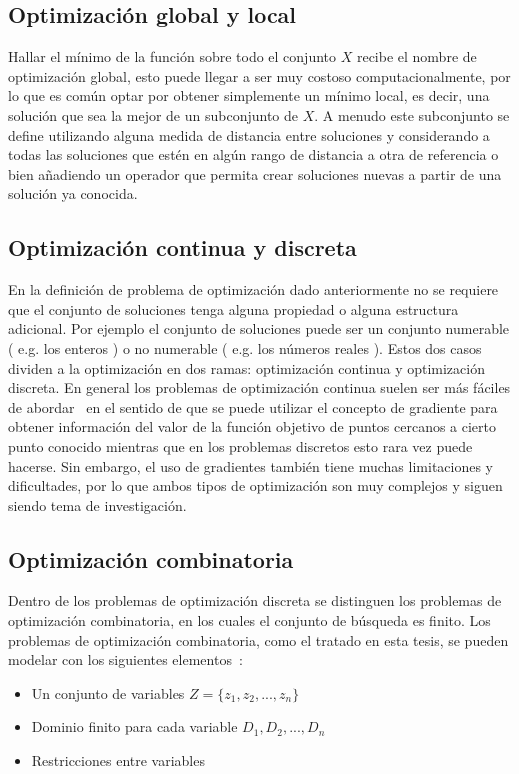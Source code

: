 \subsection*{Optimización global y local}

Hallar el mínimo de la función sobre todo el conjunto $X$ recibe el nombre de optimización global, esto puede llegar a ser muy costoso computacionalmente,
por lo que es común optar por obtener simplemente un mínimo local, es decir, una solución que sea la mejor de un subconjunto de $X$. 
%
A menudo este subconjunto se define utilizando alguna medida de distancia entre soluciones y considerando a todas las soluciones que estén en algún rango 
de distancia a otra de referencia o bien añadiendo un operador que permita crear soluciones nuevas a partir de una solución ya conocida.

\subsection*{Optimización continua y discreta}
En la definición de problema de optimización dado anteriormente no se requiere que el conjunto de soluciones tenga alguna propiedad o alguna estructura 
adicional. 
%
Por ejemplo el conjunto de soluciones puede ser un conjunto numerable ( e.g. los enteros ) o no numerable ( e.g. los números reales ). 
%
Estos dos casos dividen a la optimización en dos ramas: optimización continua y optimización discreta. 
%
En general los problemas de optimización continua suelen ser más fáciles de abordar~\cite{nocedal2006numerical} en el sentido de que se puede utilizar
el concepto de gradiente para obtener información del valor de la función objetivo de puntos cercanos a cierto punto conocido mientras que en los problemas 
discretos esto rara vez puede hacerse.
%
Sin embargo, el uso de gradientes también tiene muchas limitaciones y dificultades, por lo que ambos tipos de optimización son muy complejos y siguen
siendo tema de investigación.

\subsection*{Optimización combinatoria}
Dentro de los problemas de optimización discreta se distinguen los problemas de optimización combinatoria, en los cuales el conjunto de búsqueda es finito.
%
Los problemas de optimización combinatoria, como el tratado en esta tesis, se pueden modelar con los siguientes elementos~\cite{Blum2003}:

\begin{itemize}
    \item Un conjunto de variables $Z=\{z_1,z_2,...,z_n\}$
    \item Dominio finito para cada variable $D_1,D_2,...,D_n$
    \item Restricciones entre variables
\end{itemize}

